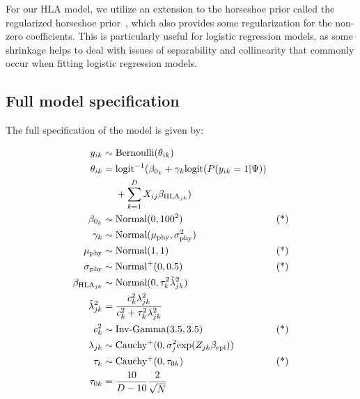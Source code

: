 \documentclass{bioinfo}
\begin{document}
\begin{methods}
For our HLA model, we utilize an extension to the horseshoe prior called the regularized horseshoe prior~\citep{Piironen2017}, which also provides some regularization for the non-zero coefficients. This is particularly useful for logistic regression models, as some shrinkage helps to deal with issues of separability and collinearity that commonly occur when fitting logistic regression models.

\subsection{Full model specification}

The full specification of the model is given by:

\begin{equation}
  \label{eq:full}
  \begin{aligned}
   y_{ik} &\sim \text{Bernoulli}(\theta_{ik}) &\\
   \theta_{ik} &=
        \text{logit}^{-1}(\beta_{0_{k}} + \gamma_{k}\text{logit}(P(y_{ik}=1|\Psi)) & \\
        \hspace{-6cm} &~~~~ +\sum_{k=1}^{D}X_{ij}\beta_{\text{HLA}_{jk}}) & \\
    \beta_{0_{k}} &\sim \text{Normal}(0, 100^2) & \text{(*)}\\
   \gamma_{k} &\sim \text{Normal}(\mu_{\text{phy}}, \sigma_{\text{phy}}^2) & \\
    \mu_{\text{phy}} &\sim \text{Normal}(1, 1) & \text{(*)} \\
   \sigma_{\text{phy}} &\sim \text{Normal}^{+}(0, 0.5) & \text{(*)} \\
   \beta_{\text{HLA}_{jk}} &\sim \text{Normal}(0, \tau_{k}^{2}\tilde{\lambda}^{2}_{jk}) & \\
   \tilde{\lambda}^{2}_{jk} &= \frac{c_{k}^{2}\lambda_{jk}^{2}}{c_{k}^{2} + \tau_{k}^{2}\lambda_{jk}^{2}} & \\
    c_{k}^2 &\sim \text{Inv-Gamma}(3.5, 3.5) & \text{(*)} \\
   \lambda_{jk} &\sim \text{Cauchy}^{+}(0, \sigma_{j}^2\text{exp}(Z_{jk}\beta_{\text{epi}})) & \\
   \tau_{k} &\sim \text{Cauchy}^{+}(0, \tau_{0k}) & \text{(*)} \\
   \tau_{0k} &= \frac{10}{D-10}\frac{2}{\sqrt{N}} & \\
  \end{aligned}
\end{equation}


\end{methods}
\end{document}
